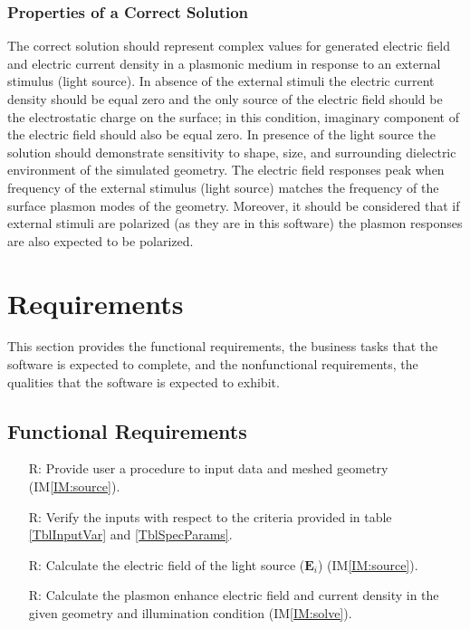 \documentclass[12pt]{article}
\newcounter{reqnum} %
\begin{document}
	\subsubsection{Properties of a Correct Solution} \label{sec_CorrectSolution}
	
	The correct solution should represent complex values for generated electric field and electric current density in a plasmonic medium in response to an external stimulus (light source). In absence of the external stimuli the electric current density should be equal zero and the only source of the electric field should be the electrostatic charge on the surface; in this condition, imaginary component of the electric field should also be equal zero. In presence of the light source the solution should demonstrate sensitivity to shape, size, and surrounding dielectric environment of the simulated geometry. The electric field responses peak when frequency of the external stimulus (light source) matches the frequency of the surface plasmon modes of the geometry. Moreover, it should be considered that if external stimuli are polarized (as they are in this software) the plasmon responses are also expected to be polarized. 

	
	
	
	\section{Requirements}
	\label{req}
	
	This section provides the functional requirements, the business tasks that the
	software is expected to complete, and the nonfunctional requirements, the
	qualities that the software is expected to exhibit.
	
	\subsection{Functional Requirements}
	
	\noindent \begin{itemize}
		
		\item[R\refstepcounter{reqnum}\thereqnum \label{R_1}:] Provide user a procedure to input data and meshed geometry (IM\ref{IM:source}).
		
		\item[R\refstepcounter{reqnum}\thereqnum \label{R_2}:] Verify the inputs with respect to the criteria provided in table \ref{TblInputVar} and \ref{TblSpecParams}.
		
		\item[R\refstepcounter{reqnum}\thereqnum \label{R_3}:] Calculate the
		electric field of the light source ($\textbf{E}_i$)
		(IM\ref{IM:source}).
		
		\item[R\refstepcounter{reqnum}\thereqnum \label{R_4}:] Calculate the
		plasmon enhance electric field and current density in the given geometry and illumination condition
		(IM\ref{IM:solve}).

		
		
	\end{itemize}
	
\end{document}
